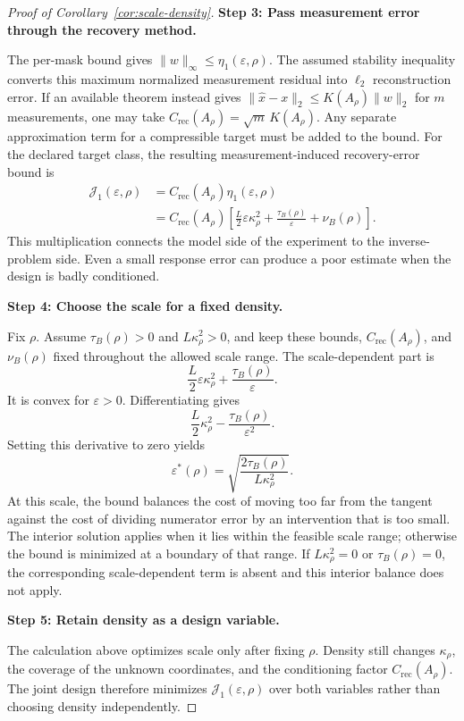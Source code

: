\documentclass[sigconf,10pt,nonacm,balance=false]{acmart}
\newcommand{\eps}{\varepsilon}
\begin{document}
\begin{proof}[Proof of Corollary~\ref{cor:scale-density}]
\noindent\textbf{Step 3: Pass measurement error through the recovery method.}\par
The per-mask bound gives $\|w\|_\infty\le\eta_1(\eps,\rho)$. The assumed stability inequality converts this maximum normalized measurement residual into $\ell_2$ reconstruction error. If an available theorem instead gives $\|\widehat x-x\|_2\le K(A_\rho)\|w\|_2$ for $m$ measurements, one may take $C_{\mathrm{rec}}(A_\rho)=\sqrt m\,K(A_\rho)$. Any separate approximation term for a compressible target must be added to the bound. For the declared target class, the resulting measurement-induced recovery-error bound is
\begin{equation}
\begin{aligned}
    \mathcal J_1(\eps,\rho)
    &=
    C_{\mathrm{rec}}(A_\rho)\eta_1(\eps,\rho)\\
    &=
    C_{\mathrm{rec}}(A_\rho)
    \left[
        \frac{L}{2}\eps\kappa_\rho^2
        +
        \frac{\tau_B(\rho)}{\eps}
        +
        \nu_B(\rho)
    \right].
\end{aligned}
\end{equation}
This multiplication connects the model side of the experiment to the inverse-problem side. Even a small response error can produce a poor estimate when the design is badly conditioned.

\noindent\textbf{Step 4: Choose the scale for a fixed density.}\par
Fix $\rho$. Assume $\tau_B(\rho)>0$ and $L\kappa_\rho^2>0$, and keep these bounds, $C_{\mathrm{rec}}(A_\rho)$, and $\nu_B(\rho)$ fixed throughout the allowed scale range. The scale-dependent part is
\[
    \frac{L}{2}\eps\kappa_\rho^2
    +
    \frac{\tau_B(\rho)}{\eps}.
\]
It is convex for $\eps>0$. Differentiating gives
\begin{equation}
    \frac{L}{2}\kappa_\rho^2
    -
    \frac{\tau_B(\rho)}{\eps^2}.
\end{equation}
Setting this derivative to zero yields
\begin{equation}
    \eps^*(\rho)
    =
    \sqrt{
        \frac{2\tau_B(\rho)}
             {L\kappa_\rho^2}
    }.
\end{equation}
At this scale, the bound balances the cost of moving too far from the tangent against the cost of dividing numerator error by an intervention that is too small. The interior solution applies when it lies within the feasible scale range; otherwise the bound is minimized at a boundary of that range. If $L\kappa_\rho^2=0$ or $\tau_B(\rho)=0$, the corresponding scale-dependent term is absent and this interior balance does not apply.

\noindent\textbf{Step 5: Retain density as a design variable.}\par
The calculation above optimizes scale only after fixing $\rho$. Density still changes $\kappa_\rho$, the coverage of the unknown coordinates, and the conditioning factor $C_{\mathrm{rec}}(A_\rho)$. The joint design therefore minimizes $\mathcal J_1(\eps,\rho)$ over both variables rather than choosing density independently.
\end{proof}
\end{document}

